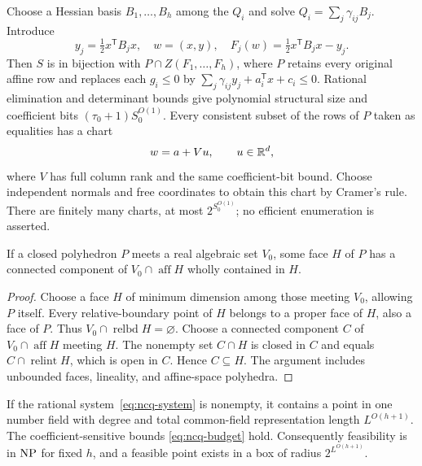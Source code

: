 Choose a Hessian basis $B_1,\ldots,B_h$ among the $Q_i$ and solve
$Q_i=\sum_j\gamma_{ij}B_j$. Introduce
\begin{equation}
\label{eq:ncq-lift}
 y_j=\tfrac12x^{\mathsf T}B_jx,\quad w=(x,y),\quad
 F_j(w)=\tfrac12x^{\mathsf T}B_jx-y_j.
\end{equation}
Then $S$ is in bijection with
$P\cap Z(F_1,\ldots,F_h)$, where $P$ retains every original affine row
and replaces each $g_i\le0$ by
$\sum_j\gamma_{ij}y_j+a_i^{\mathsf T}x+c_i\le0$.
Rational elimination and determinant bounds give polynomial structural
size and coefficient bits $(\tau_0+1)S_0^{O(1)}$. Every consistent
subset of the rows of $P$ taken as equalities has a chart
\begin{equation}
\label{eq:ncq-chart}
 w=a+Vu,\qquad u\in\mathbb R^d,
\end{equation}
where $V$ has full column rank and the same coefficient-bit bound. Choose
independent normals and free coordinates to obtain this chart by Cramer's
rule. There are finitely many charts, at most $2^{S_0^{O(1)}}$; no efficient
enumeration is asserted.

\begin{lemma}
\label{lem:ncq-face}
If a closed polyhedron $P$ meets a real algebraic set $V_0$, some face $H$
of $P$ has a connected component of $V_0\cap\operatorname{aff}H$ wholly
contained in $H$.
\end{lemma}

\begin{proof}
Choose a face $H$ of minimum dimension among those meeting $V_0$, allowing
$P$ itself. Every relative-boundary point of $H$ belongs to a proper face
of $H$, also a face of $P$. Thus
$V_0\cap\operatorname{relbd}H=\varnothing$. Choose a connected component
$C$ of $V_0\cap\operatorname{aff}H$ meeting $H$. The nonempty set
$C\cap H$ is closed in $C$ and equals $C\cap\operatorname{relint}H$,
which is open in $C$. Hence $C\subseteq H$. The argument includes
unbounded faces, lineality, and affine-space polyhedra.
\end{proof}

\begin{theorem}
\label{thm:ncq-feasible}
If the rational system~\eqref{eq:ncq-system} is nonempty, it contains a
point in one number field with degree and total common-field representation
length $L^{O(h+1)}$. The coefficient-sensitive bounds
\eqref{eq:ncq-budget} hold. Consequently feasibility is in $\mathrm{NP}$ for fixed
$h$, and a feasible point exists in a box of radius $2^{L^{O(h+1)}}$.
\end{theorem}

